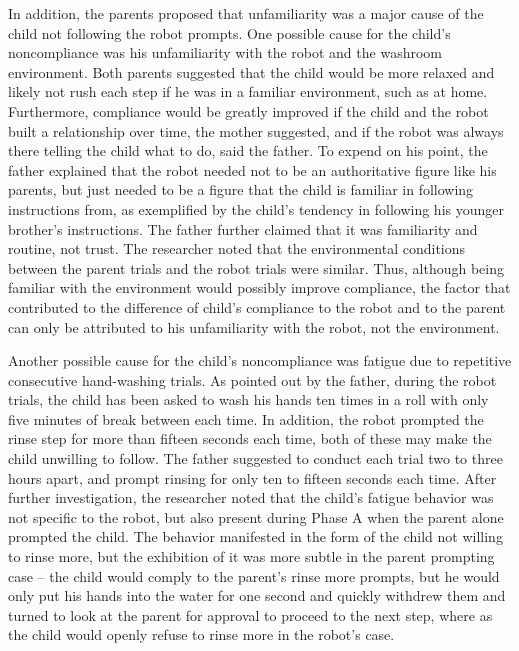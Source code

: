 In addition, the parents proposed that unfamiliarity was a major cause of the child not following the robot prompts.  One possible cause for the child's noncompliance was his unfamiliarity with the robot and the washroom environment.  Both parents suggested that the child would be more relaxed and likely not rush each step if he was in a familiar environment, such as at home.  Furthermore, compliance would be greatly improved if the child and the robot built a relationship over time, the mother suggested, and if the robot was always there telling the child what to do, said the father.  To expend on his point, the father explained that the robot needed not to be an authoritative figure like his parents, but just needed to be a figure that the child is familiar in following instructions from, as exemplified by the child's tendency in following his younger brother's instructions.  The father further claimed that it was familiarity and routine, not trust.  The researcher noted that the environmental conditions between the parent trials and the robot trials were similar.  Thus, although being familiar with the environment would possibly improve compliance, the factor that contributed to the difference of child's compliance to the robot and to the parent can only be attributed to his unfamiliarity with the robot, not the environment.

Another possible cause for the child's noncompliance was fatigue due to repetitive consecutive hand-washing trials.  As pointed out by the father, during the robot trials, the child has been asked to wash his hands ten times in a roll with only five minutes of break between each time.  In addition, the robot prompted the rinse step for more than fifteen seconds each time, both of these may make the child unwilling to follow.  The father suggested to conduct each trial two to three hours apart, and prompt rinsing for only ten to fifteen seconds each time.  After further investigation, the researcher noted that the child's fatigue behavior was not specific to the robot, but also present during Phase A when the parent alone prompted the child.  The behavior manifested in the form of the child not willing to rinse more, but the exhibition of it was more subtle in the parent prompting case -- the child would comply to the parent's rinse more prompts, but he would only put his hands into the water for one second and quickly withdrew them and turned to look at the parent for approval to proceed to the next step, where as the child would openly refuse to rinse more in the robot's case.

